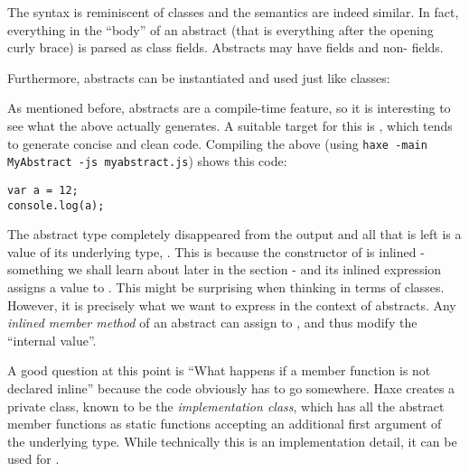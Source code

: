 
The syntax is reminiscent of classes and the semantics are indeed similar. In fact, everything in the ``body'' of an abstract (that is everything after the opening curly brace) is parsed as class fields. Abstracts may have  fields and non-  fields.

Furthermore, abstracts can be instantiated and used just like classes:

As mentioned before, abstracts are a compile-time feature, so it is interesting to see what the above actually generates. A suitable target for this is , which tends to generate concise and clean code. Compiling the above (using \texttt{haxe -main MyAbstract -js myabstract.js}) shows this  code:

\begin{lstlisting}
var a = 12;
console.log(a);
\end{lstlisting}
The abstract type  completely disappeared from the output and all that is left is a value of its underlying type, . This is because the constructor of  is inlined - something we shall learn about later in the section  - and its inlined expression assigns a value to . This might be surprising when thinking in terms of classes. However, it is precisely what we want to express in the context of abstracts. Any \emph{inlined member method} of an abstract can assign to , and thus modify the ``internal value''.


A good question at this point is ``What happens if a member function is not declared inline'' because the code obviously has to go somewhere. Haxe creates a private class, known to be the \emph{implementation class}, which has all the abstract member functions as static functions accepting an additional first argument  of the underlying type. While technically this is an implementation detail, it can be used for .







